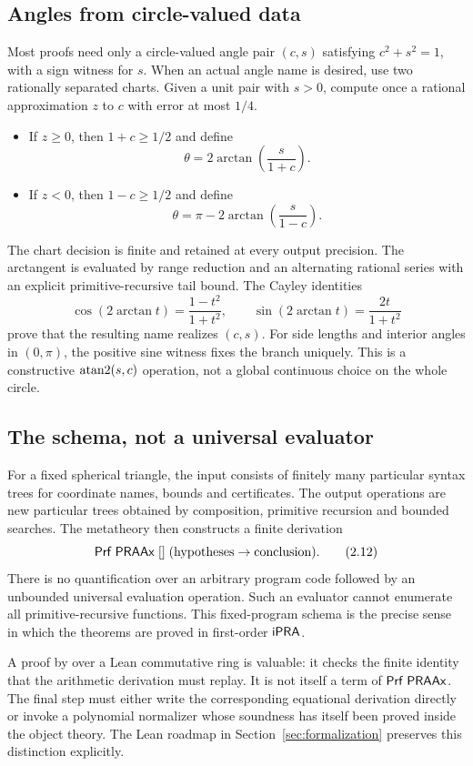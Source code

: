 \subsection{Angles from circle-valued data}

Most proofs need only a circle-valued angle pair \((c,s)\) satisfying
\(c^2+s^2=1\), with a sign witness for \(s\).  When an actual angle name is
desired, use two rationally separated charts.  Given a unit pair with
\(s>0\), compute once a rational approximation \(z\) to \(c\) with error at
most \(1/4\).
\begin{itemize}
\item If \(z\ge0\), then \(1+c\ge1/2\) and define
\[
 \theta=2\arctan\!\left(\frac{s}{1+c}\right).
\]
\item If \(z<0\), then \(1-c\ge1/2\) and define
\[
 \theta=\pi-2\arctan\!\left(\frac{s}{1-c}\right).
\]
\end{itemize}
The chart decision is finite and retained at every output precision.  The
arctangent is evaluated by range reduction and an alternating rational series
with an explicit primitive-recursive tail bound.  The Cayley identities
\[
 \cos(2\arctan t)=\frac{1-t^2}{1+t^2},\qquad
 \sin(2\arctan t)=\frac{2t}{1+t^2}                           \tag{2.11}
\]
prove that the resulting name realizes \((c,s)\).  For side lengths and
interior angles in \((0,\pi)\), the positive sine witness fixes the branch
uniquely.  This is a constructive \(\operatorname{atan2}(s,c)\) operation, not a global
continuous choice on the whole circle.

\subsection{The schema, not a universal evaluator}

For a fixed spherical triangle, the input consists of finitely many particular
 syntax trees for coordinate names, bounds and certificates.  The
output operations are new particular  trees obtained by composition,
primitive recursion and bounded searches.  The metatheory then constructs a
finite derivation
\[
 \mathsf{Prf}\;\mathsf{PRAAx}\;[]\;(\text{hypotheses}\to\text{conclusion}). \tag{2.12}
\]
There is no quantification over an arbitrary program code followed by an
unbounded universal evaluation operation.  Such an evaluator cannot enumerate
all primitive-recursive functions.  This fixed-program schema is the precise
sense in which the theorems are proved in first-order \(\mathsf{iPRA}\).

\begin{remark}
A proof by  over a Lean commutative ring is valuable: it checks the
finite identity that the arithmetic derivation must replay.  It is not itself
a term of \(\mathsf{Prf}\;\mathsf{PRAAx}\).  The final step must either write the corresponding
equational derivation directly or invoke a polynomial normalizer whose
soundness has itself been proved inside the object theory.  The Lean roadmap in
Section~\ref{sec:formalization} preserves this distinction explicitly.
\end{remark}
